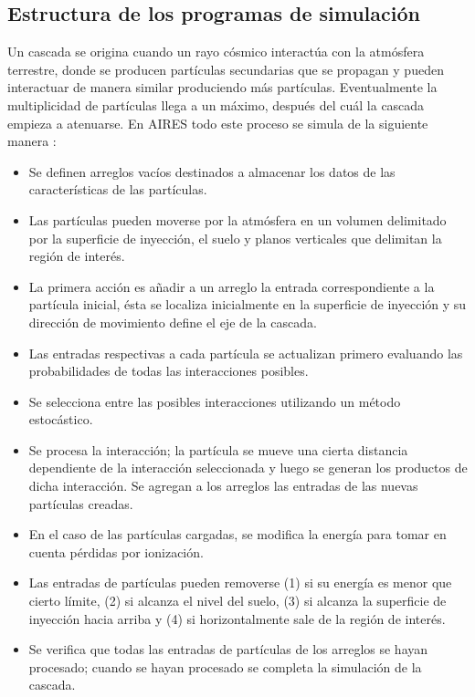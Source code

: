 	\subsection{Estructura de los programas de simulación}
	Un cascada se origina cuando un rayo cósmico interactúa con la atmósfera terrestre, donde se producen partículas secundarias que se propagan y pueden interactuar de manera similar produciendo más partículas. Eventualmente la multiplicidad de partículas llega a un máximo, después del cuál  la cascada empieza a atenuarse. En AIRES todo este proceso se simula de la siguiente manera \cite{Sciutto2002}:
	\begin{itemize}
	\item Se definen arreglos vacíos destinados a almacenar los datos de las características de las partículas.
	\item Las partículas pueden moverse por la atmósfera en un volumen delimitado por la superficie de inyección, el suelo y planos verticales que delimitan la región de interés.
	\item La primera acción es añadir a un arreglo la entrada correspondiente a la partícula inicial, ésta se localiza inicialmente en la superficie de inyección y su dirección de movimiento define el eje de la cascada.
	\item Las entradas respectivas a cada partícula se actualizan primero evaluando las probabilidades de todas las interacciones posibles.
	\item Se selecciona entre las posibles interacciones utilizando un método estocástico.
	\item Se procesa la interacción; la partícula se mueve una cierta distancia dependiente de la interacción seleccionada y luego se generan los productos de dicha interacción. Se agregan a los arreglos las entradas de las nuevas partículas creadas.
	\item En el caso de las partículas cargadas, se modifica la energía para tomar en cuenta pérdidas por ionización.
	\item Las entradas de partículas pueden removerse (1) si su energía es menor que cierto límite, (2) si alcanza el nivel del suelo, (3) si alcanza la superficie de inyección hacia arriba y (4) si horizontalmente sale de la región de interés.
	\item Se verifica que todas las entradas de partículas de los arreglos se hayan procesado; cuando se hayan procesado se completa la simulación de la cascada.
	\end{itemize}	
	
